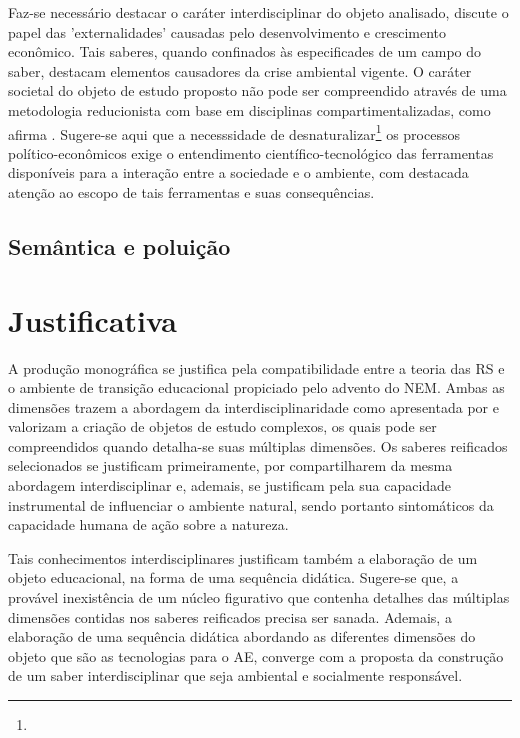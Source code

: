 \documentclass[
  12pt,       %
  openright,      %
  twoside,      %
  a4paper,      %
  english,      %
  french,       %
  spanish,      %
  brazil        %
  ]{abntex2}
\begin{document}
Faz-se necessário destacar o caráter interdisciplinar do objeto analisado,  discute o papel das 'externalidades' causadas pelo desenvolvimento e crescimento econômico. Tais saberes, quando confinados às especificades de um campo do saber, destacam elementos causadores da crise ambiental vigente. O caráter societal do objeto de estudo proposto não pode ser compreendido através de uma metodologia reducionista com base em disciplinas compartimentalizadas, como afirma . Sugere-se aqui que a necesssidade de desnaturalizar\footnote{} os processos político-econômicos exige o entendimento científico-tecnológico das ferramentas disponíveis para a interação entre a sociedade e o ambiente, com destacada atenção ao escopo de tais ferramentas e suas consequências.


\section{Semântica e poluição}



\chapter{Justificativa}

A produção monográfica se justifica pela compatibilidade entre a teoria das RS e o ambiente de transição educacional propiciado pelo advento do NEM. Ambas as dimensões trazem a abordagem da interdisciplinaridade como apresentada por  e valorizam a criação de objetos de estudo complexos, os quais pode ser compreendidos quando detalha-se suas múltiplas dimensões. Os saberes reificados selecionados se justificam primeiramente, por compartilharem da mesma abordagem interdisciplinar e, ademais, se justificam pela sua capacidade instrumental de influenciar o ambiente natural, sendo portanto sintomáticos da capacidade humana de ação sobre a natureza.

Tais conhecimentos interdisciplinares justificam também a elaboração de um objeto educacional, na forma de uma sequência didática. Sugere-se que, a provável inexistência de um núcleo figurativo que contenha detalhes das múltiplas dimensões contidas nos saberes reificados precisa ser sanada. Ademais, a elaboração de uma sequência didática abordando as diferentes dimensões do objeto que são as tecnologias para o AE, converge com a proposta da construção de um saber interdisciplinar que seja ambiental e socialmente responsável. 
\end{document}
